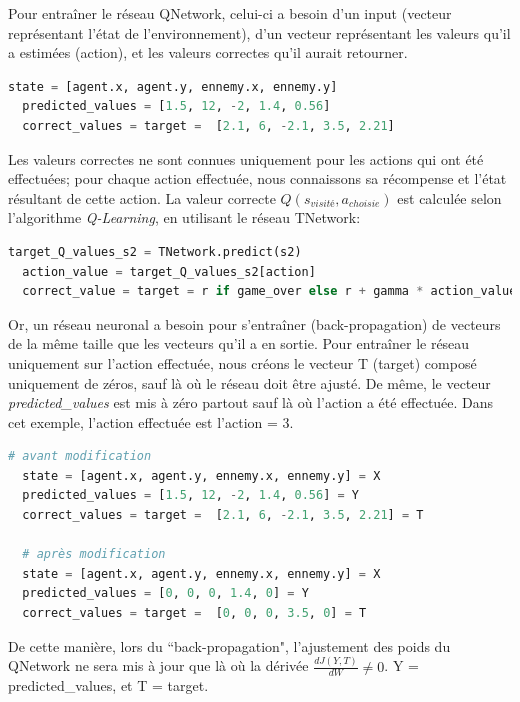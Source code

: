 \documentclass[11pt,a4paper]{report}
\begin{document}
  \par Pour entraîner le réseau QNetwork, celui-ci a besoin d'un input (vecteur représentant l'état de l'environnement), d'un vecteur représentant les valeurs qu'il a estimées (action), et les valeurs correctes qu'il aurait retourner. 
  
  \begin{lstlisting}[language=python]
  state = [agent.x, agent.y, ennemy.x, ennemy.y]
  predicted_values = [1.5, 12, -2, 1.4, 0.56]
  correct_values = target =  [2.1, 6, -2.1, 3.5, 2.21]
  \end{lstlisting} 
  
  \par Les valeurs correctes ne sont connues uniquement pour les actions qui ont été effectuées; pour chaque action effectuée, nous connaissons sa récompense et l'état résultant de cette action. La valeur correcte $Q(s_{visité}, a_{choisie})$ est calculée selon l'algorithme \textit{Q-Learning}, en utilisant le réseau TNetwork:
  
  \begin{lstlisting}[language=python]
  target_Q_values_s2 = TNetwork.predict(s2)
  action_value = target_Q_values_s2[action]
  correct_value = target = r if game_over else r + gamma * action_value
  \end{lstlisting}   
  
  \par Or, un réseau neuronal a besoin pour s’entraîner (back-propagation) de vecteurs de la même taille que les vecteurs qu'il a en sortie. Pour entraîner le réseau uniquement sur l'action effectuée, nous créons le vecteur T (target) composé uniquement de zéros, sauf là où le réseau doit être ajusté. De même, le vecteur \textit{predicted\_values} est mis à zéro partout sauf là où l'action a été effectuée. Dans cet exemple, l'action effectuée est l'action = 3. 
  
  \begin{lstlisting}[language=python]
  # avant modification
  state = [agent.x, agent.y, ennemy.x, ennemy.y] = X
  predicted_values = [1.5, 12, -2, 1.4, 0.56] = Y
  correct_values = target =  [2.1, 6, -2.1, 3.5, 2.21] = T
  
  # après modification
  state = [agent.x, agent.y, ennemy.x, ennemy.y] = X
  predicted_values = [0, 0, 0, 1.4, 0] = Y
  correct_values = target =  [0, 0, 0, 3.5, 0] = T
  \end{lstlisting} 
  
  \par De cette manière, lors du ``back-propagation", l'ajustement des poids du QNetwork ne sera mis à jour que là où la dérivée $\frac{dJ(Y,T)}{dW} \neq 0$. Y = predicted\_values, et T = target.
  
\end{document}
